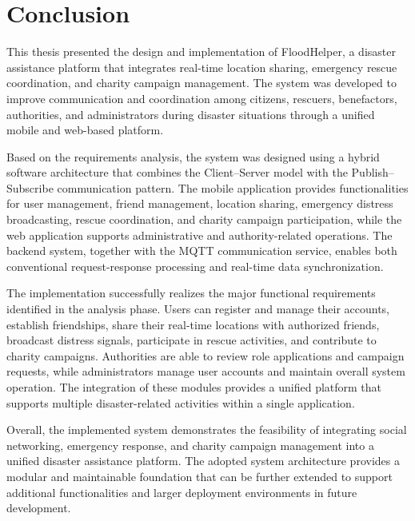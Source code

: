 \documentclass[../Main.tex]{subfiles}
\begin{document}
\section{Conclusion}

This thesis presented the design and implementation of FloodHelper, a disaster assistance platform that integrates real-time location sharing, emergency rescue coordination, and charity campaign management. The system was developed to improve communication and coordination among citizens, rescuers, benefactors, authorities, and administrators during disaster situations through a unified mobile and web-based platform.

Based on the requirements analysis, the system was designed using a hybrid software architecture that combines the Client–Server model with the Publish–Subscribe communication pattern. The mobile application provides functionalities for user management, friend management, location sharing, emergency distress broadcasting, rescue coordination, and charity campaign participation, while the web application supports administrative and authority-related operations. The backend system, together with the MQTT communication service, enables both conventional request-response processing and real-time data synchronization.

The implementation successfully realizes the major functional requirements identified in the analysis phase. Users can register and manage their accounts, establish friendships, share their real-time locations with authorized friends, broadcast distress signals, participate in rescue activities, and contribute to charity campaigns. Authorities are able to review role applications and campaign requests, while administrators manage user accounts and maintain overall system operation. The integration of these modules provides a unified platform that supports multiple disaster-related activities within a single application.

Overall, the implemented system demonstrates the feasibility of integrating social networking, emergency response, and charity campaign management into a unified disaster assistance platform. The adopted system architecture provides a modular and maintainable foundation that can be further extended to support additional functionalities and larger deployment environments in future development.
\end{document}

